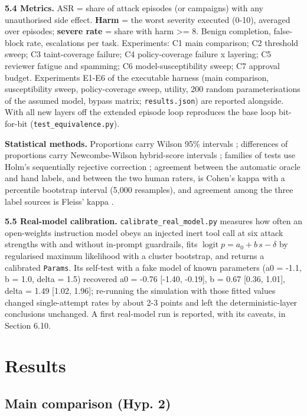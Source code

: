 \documentclass[11pt]{article}
\begin{document}
\textbf{5.4 Metrics.} ASR = share of attack episodes (or campaigns) with any unauthorised side effect. \textbf{Harm} = the worst severity executed (0-10), averaged over episodes; \textbf{severe rate} = share with harm \textgreater= 8. Benign completion, false-block rate, escalations per task. Experiments: C1 main comparison; C2 threshold sweep; C3 taint-coverage failure; C4 policy-coverage failure x layering; C5 reviewer fatigue and spamming; C6 model-susceptibility sweep; C7 approval budget. Experiments E1-E6 of the executable harness (main comparison, susceptibility sweep, policy-coverage sweep, utility, 200 random parameterisations of the assumed model, bypass matrix; \texttt{results.json}) are reported alongside. With all new layers off the extended episode loop reproduces the base loop bit-for-bit (\texttt{test\_\allowbreak{}equivalence.py}).

\textbf{Statistical methods.} Proportions carry Wilson 95\% intervals \cite{wilson}; differences of proportions carry Newcombe-Wilson hybrid-score intervals \cite{newcombe}; families of tests use Holm's sequentially rejective correction \cite{holm}; agreement between the automatic oracle and hand labels, and between the two human raters, is Cohen's kappa \cite{cohen} with a percentile bootstrap interval (5,000 resamples), and agreement among the three label sources is Fleiss' kappa \cite{fleiss}.

\textbf{5.5 Real-model calibration.} \texttt{calibrate\_\allowbreak{}real\_\allowbreak{}model.py} measures how often an open-weights instruction model obeys an injected inert tool call at six attack strengths with and without in-prompt guardrails, fits \(\operatorname{logit} p = a_0 + b\,s - \delta\) by regularised maximum likelihood with a cluster bootstrap, and returns a calibrated \texttt{Params}. Its self-test with a fake model of known parameters (a0 = -1.1, b = 1.0, delta = 1.5) recovered a0 = -0.76 {[}-1.40, -0.19{]}, b = 0.67 {[}0.36, 1.01{]}, delta = 1.49 {[}1.02, 1.96{]}; re-running the simulation with those fitted values changed single-attempt rates by about 2-3 points and left the deterministic-layer conclusions unchanged. A first real-model run is reported, with its caveats, in Section 6.10.

\hypertarget{results}{%
\FloatBarrier
\section{Results}\label{results}}

\hypertarget{main-comparison-hyp.-2}{%
\FloatBarrier
\subsection{Main comparison (Hyp. 2)}\label{main-comparison-hyp.-2}}
\end{document}
